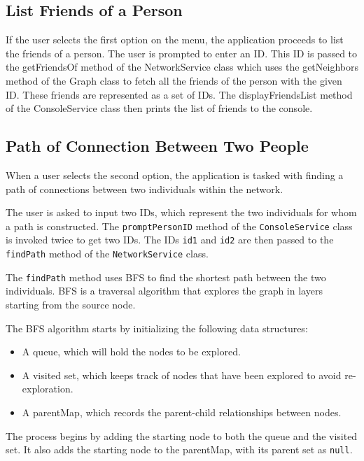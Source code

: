 \subsection*{\textbf{List Friends of a Person}}
If the user selects the first option on the menu, the application proceeds to list the friends of a person. The user is prompted to enter an ID. This ID is passed to the getFriendsOf method of the NetworkService class which uses the getNeighbors method of the Graph class to fetch all the friends of the person with the given ID. These friends are represented as a set of IDs.
The displayFriendsList method of the ConsoleService class then prints the list of friends to the console.

\subsection*{\textbf{Path of Connection Between Two People}}

When a user selects the second option, the application is tasked with finding a path of connections between two individuals within the network.

The user is asked to input two IDs, which represent the two individuals for whom a path is constructed. The \texttt{promptPersonID} method of the \texttt{ConsoleService} class is invoked twice to get two IDs. The IDs \texttt{id1} and \texttt{id2} are then passed to the \texttt{findPath} method of the \texttt{NetworkService} class.

The \texttt{findPath} method uses BFS to find the shortest path between the two individuals. BFS is a traversal algorithm that explores the graph in layers starting from the source node.

The BFS algorithm starts by initializing the following data structures:
\begin{itemize}
	\item A queue, which will hold the nodes to be explored.
	\item A visited set, which keeps track of nodes that have been explored to avoid re-exploration.
	\item A parentMap, which records the parent-child relationships between nodes.
\end{itemize}

The process begins by adding the starting node to both the queue and the visited set. It also adds the starting node to the parentMap, with its parent set as \texttt{null}.


